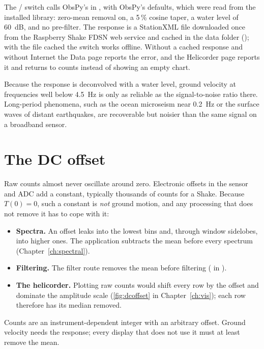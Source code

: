 \begin{rs3dapp}
The / switch calls ObsPy's  in
, with ObsPy's defaults, which were read from the installed library: zero-mean removal on, a
5\,\% cosine taper, a water level of 60~dB, and no pre-filter. The response is a StationXML file downloaded once from
the Raspberry Shake FDSN web service and cached in the data folder (); with the file cached
the switch works offline. Without a cached response and without Internet the Data page reports the error, and the Helicorder page
reports it and returns to counts instead of showing an empty chart.
\end{rs3dapp}

\begin{rs3dwarn}
Because the response is deconvolved with a water level, ground velocity at frequencies well below
4.5~Hz is only as reliable as the signal-to-noise ratio there. Long-period phenomena, such as the ocean microseism near
0.2~Hz or the surface waves of distant earthquakes, are recoverable but noisier than the same signal on a broadband
sensor.
\end{rs3dwarn}

\section{The DC offset}
Raw counts almost never oscillate around zero. Electronic offsets in the sensor and ADC add a constant,
typically thousands of counts for a Shake. Because $T(0)=0$, such a constant is \emph{not} ground motion, and any
processing that does not remove it has to cope with it:

\begin{itemize}
\item \textbf{Spectra.} An offset leaks into the lowest bins and, through window sidelobes, into higher ones.
  The application subtracts the mean before every spectrum (Chapter~\ref{ch:spectral}).
\item \textbf{Filtering.} The filter route removes the mean before filtering ( in
  ).
\item \textbf{The helicorder.} Plotting raw counts would shift every row by the offset and dominate the amplitude
  scale (\cref{fig:dcoffset} in Chapter~\ref{ch:vis}); each row therefore has its median removed.
\end{itemize}

\begin{rs3dkey}
Counts are an instrument-dependent integer with an arbitrary offset. Ground velocity needs the response; every
display that does not use it must at least remove the mean.
\end{rs3dkey}
